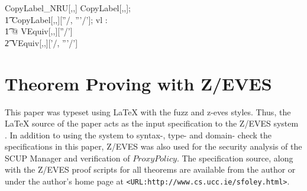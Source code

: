 \begin{theorem}{CopyLabel\_NRU}[\LEVEL,\LABEL,\FID]
\forall 
        CopyLabel[\LEVEL,\LABEL,\FID]; \\
\t1        CopyLabel[\LEVEL,\LABEL,\FID][\delta''/\delta, \delta'''/\delta']; 
        vl : \LEVEL  \\
\t1   @ VEquiv[\LEVEL,\LABEL,\FID][\delta''/\delta'] \\
\t2 \implies VEquiv[\LEVEL,\LABEL,\FID][\delta'/\delta, \delta'''/\delta'] 
\end{theorem}
 
\section{Theorem Proving with Z/EVES}

This paper was typeset using LaTeX with the fuzz and z-eves styles.
Thus, the LaTeX source of the paper acts as the input specification to
the Z/EVES system \cite{saaltink:97}.  In addition to using the system
to syntax-, type- and domain- check the specifications in this paper,
Z/EVES was also used for the security analysis of the SCUP Manager and
verification of $ProxyPolicy$.  The  specification source, along
with the Z/EVES proof scripts for all theorems are available from the
author or under the author's home page at 
\verb|<URL:http://www.cs.ucc.ie/sfoley.html>|.


